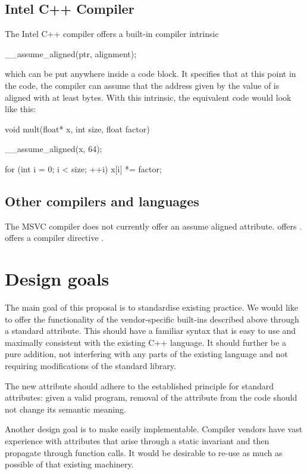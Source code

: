 \subsection{Intel C++ Compiler}

The Intel C++ compiler \cite{ICC} offers a built-in compiler intrinsic 

\begin{codeblock}
__assume_aligned(ptr, alignment);
\end{codeblock}

which can be put anywhere inside a code block. It specifies that at this point in the code, the compiler can assume that the address given by the value of  is aligned with at least  bytes. With this intrinsic, the equivalent code would look like this:

\begin{codeblock}
void mult(float* x, int size, float factor)
{
    __assume_aligned(x, 64);

    for (int i = 0; i < size; ++i)
        x[i] *= factor;
}
\end{codeblock}

\subsection{Other compilers and languages}

The MSVC compiler does not currently offer an assume aligned attribute. \cite{OpenMP} offers . \cite{Fortran} offers a compiler directive .
\section{Design goals}
The main goal of this proposal is to standardise existing practice. We would like to offer the functionality of the vendor-specific built-ins described above through a standard  attribute. This should have a familiar syntax that is easy to use and maximally consistent with the existing C++ language. It should further be a pure addition, not interfering with any parts of the existing language and not requiring modifications of the standard library. 

The new  attribute should adhere to the established principle for standard attributes: given a valid program, removal of the attribute from the code should not change its semantic meaning.

Another design goal is to make  easily implementable. Compiler vendors have vast experience with attributes that arise through a static invariant and then propagate through function calls. It would be desirable to re-use as much as possible of that existing machinery.


